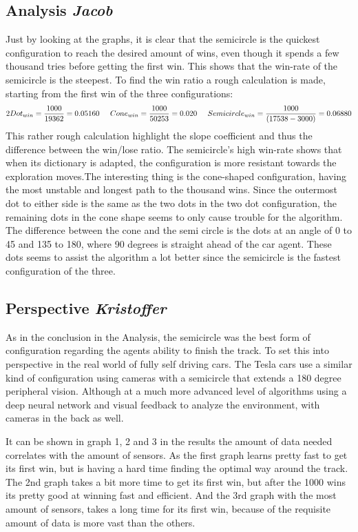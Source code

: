 \subsection{Analysis  \vspace{0.5mm} \small\textit{Jacob}}
Just by looking at the graphs, it is clear that the semicircle is the quickest configuration to reach the desired amount of wins, even though it spends a few thousand tries before getting the first win. This shows that the win-rate of the semicircle is the steepest. To find the win ratio a rough calculation is made, starting from the first win of the three configurations:
\small\[2Dot_{win}=\frac{1000}{19362}=0.05160 \hspace{4.9mm} Cone_{win}=\frac{1000}{50253}=0.020 \hspace{4.9mm} Semicircle_{win} = \frac{1000}{(17538-3000)}=0.06880\]
This rather rough calculation highlight the slope coefficient and thus the difference between the win/lose ratio. The semicircle's high win-rate shows that when its dictionary is adapted, the configuration is more resistant towards the exploration moves.The interesting thing is the cone-shaped configuration, having the most unstable and longest path to the thousand wins. Since the outermost dot to either side is the same as the two dots in the two dot configuration, the remaining dots in the cone shape seems to only cause trouble for the algorithm. The difference between the cone and the semi circle is the dots at an angle of 0 to 45 and 135 to 180, where 90 degrees is straight ahead of the car agent. These dots seems to assist the algorithm a lot better since the semicircle is the fastest configuration of the three.
\subsection{Perspective  \vspace{0.5mm} \small\textit{Kristoffer}}
As in the conclusion in the Analysis, the semicircle was the best form of configuration regarding the agents ability to finish the track. To set this into perspective in the real world of fully self driving cars. The Tesla cars use a similar kind of configuration using cameras with a semicircle that extends a 180 degree peripheral vision. Although at a much more advanced level of algorithms using a deep neural network and visual feedback to analyze the environment, with cameras in the back as well. 

It can be shown in graph 1, 2 and 3 in the results the amount of data needed correlates with the amount of sensors. As the first graph learns pretty fast to get its first win, but is having a hard time finding the optimal way around the track. The 2nd graph takes a bit more time to get its first win, but after the 1000 wins its pretty good at winning fast and efficient. And the 3rd graph with the most amount of sensors, takes a long time for its first win, because of the requisite amount of data is more vast than the others.

